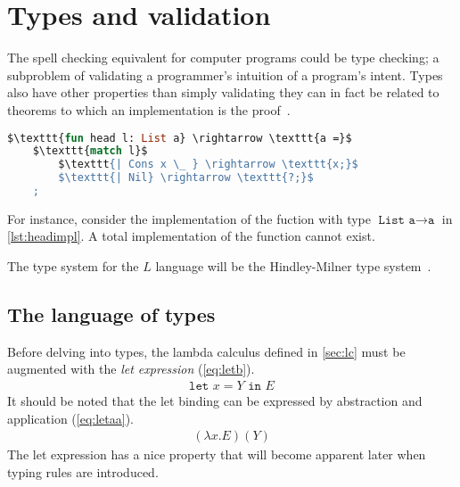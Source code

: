 \documentclass[11pt,oneside,a4paper]{report}
\begin{document}
\section{Types and validation}
The spell checking equivalent for computer programs could be type checking; a subproblem of validating a programmer's intuition of a program's intent.
Types also have other properties than simply validating they can in fact be related to theorems to which an implementation is the proof~\cite{howard1980formulae}.
\begin{lstlisting}[language=ML,caption={Head implementation},label={lst:headimpl},mathescape=true]
$\texttt{fun head l: List a} \rightarrow \texttt{a =}$
    $\texttt{match l}$
        $\texttt{| Cons x \_ } \rightarrow \texttt{x;}$
        $\texttt{| Nil} \rightarrow \texttt{?;}$
    ;
\end{lstlisting}
For instance, consider the implementation of the fuction with type $\texttt{List a} \rightarrow \texttt{a}$ in \autoref{lst:headimpl}.
A total implementation of the function cannot exist.

The type system for the $L$ language will be the Hindley-Milner type system~\cite{hindley1969principal,milner1978theory}.

\subsection{The language of types}
Before delving into types, the lambda calculus defined in \autoref{sec:lc} must be augmented with the \textit{let expression} (\autoref{eq:letb}).
\begin{align}
	\texttt{let } x = Y \texttt{ in } E
	\label{eq:letb}
\end{align}
It should be noted that the let binding can be expressed by abstraction and application (\autoref{eq:letaa}).
\begin{align}
	(\lambda x . E) (Y)
	\label{eq:letaa}
\end{align}
The let expression has a nice property that will become apparent later when typing rules are introduced.
\end{document}
